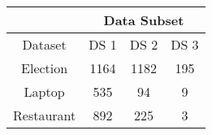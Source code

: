\begin{tabular}{|c|c|c|c|}
\hline
        & \multicolumn{3}{c|}{Data Subset} \\
\hline
Dataset &  DS 1 &  DS 2 &  DS 3 \\
\hline
Election   &  1164 &  1182 &   195 \\
\hline
Laptop     &   535 &    94 &     9 \\
\hline
Restaurant &   892 &   225 &     3 \\
\hline
\end{tabular}
